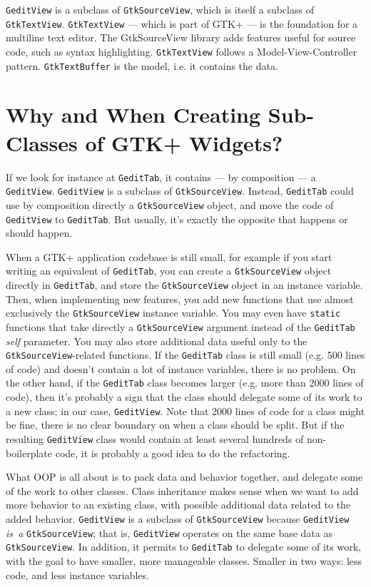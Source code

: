 \lstinline{GeditView} is a subclass of \lstinline{GtkSourceView}, which is itself a subclass of \lstinline{GtkTextView}. \lstinline{GtkTextView} --- which is part of GTK+ --- is the foundation for a multiline text editor. The GtkSourceView library adds features useful for source code, such as syntax highlighting. \lstinline{GtkTextView} follows a Model-View-Controller pattern. \lstinline{GtkTextBuffer} is the model, i.e. it contains the data.

\section{Why and When Creating Sub-Classes of GTK+ Widgets?}

If we look for instance at \lstinline{GeditTab}, it contains --- by composition --- a \lstinline{GeditView}. \lstinline{GeditView} is a subclass of \lstinline{GtkSourceView}. Instead, \lstinline{GeditTab} could use by composition directly a \lstinline{GtkSourceView} object, and move the code of \lstinline{GeditView} to \lstinline{GeditTab}. But usually, it's exactly the opposite that happens or should happen.

When a GTK+ application codebase is still small, for example if you start writing an equivalent of \lstinline{GeditTab}, you can create a \lstinline{GtkSourceView} object directly in \lstinline{GeditTab}, and store the \lstinline{GtkSourceView} object in an instance variable. Then, when implementing new features, you add new functions that use almost exclusively the \lstinline{GtkSourceView} instance variable. You may even have \lstinline{static} functions that take directly a \lstinline{GtkSourceView} argument instead of the \lstinline{GeditTab} \emph{self} parameter. You may also store additional data useful only to the \lstinline{GtkSourceView}-related functions. If the \lstinline{GeditTab} class is still small (e.g. 500 lines of code) and doesn't contain a lot of instance variables, there is no problem. On the other hand, if the \lstinline{GeditTab} class becomes larger (e.g. more than 2000 lines of code), then it's probably a sign that the class should delegate some of its work to a new class; in our case, \lstinline{GeditView}. Note that 2000 lines of code for a class might be fine, there is no clear boundary on when a class should be split. But if the resulting \lstinline{GeditView} class would contain at least several hundreds of non-boilerplate code, it is probably a good idea to do the refactoring.

What OOP is all about is to pack data and behavior together, and delegate some of the work to other classes. Class inheritance makes sense when we want to add more behavior to an existing class, with possible additional data related to the added behavior. \lstinline{GeditView} is a subclass of \lstinline{GtkSourceView} because \lstinline{GeditView} \emph{is~a} \lstinline{GtkSourceView}; that is, \lstinline{GeditView} operates on the same base data as \lstinline{GtkSourceView}. In addition, it permits to \lstinline{GeditTab} to delegate some of its work, with the goal to have smaller, more manageable classes. Smaller in two ways: less code, and less instance variables.

